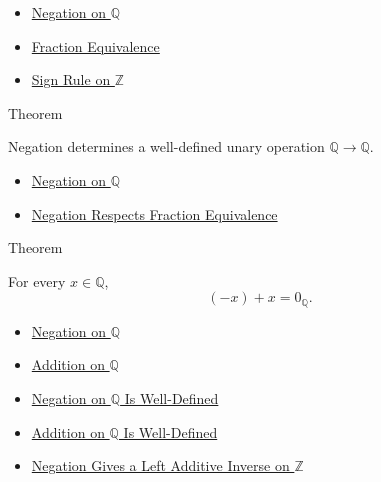 \begin{dependencies}
\begin{itemize}
  \item \hyperref[def:negation-on-q-classes]{Negation on $\mathbb{Q}$}
  \item \hyperref[def:fraction-equivalence]{Fraction Equivalence}
  \item \hyperref[cor:sign-rule-on-z]{Sign Rule on $\mathbb{Z}$}
\end{itemize}
\end{dependencies}

\begin{theorembox}{Theorem}
\begin{theorem}
\label{thm:negation-on-q-well-defined}
Negation determines a well-defined unary operation $\mathbb{Q}\to\mathbb{Q}$.
\end{theorem}
\end{theorembox}

\begin{dependencies}
\begin{itemize}
  \item \hyperref[def:negation-on-q-classes]{Negation on $\mathbb{Q}$}
  \item \hyperref[lem:negation-on-q-respects-equivalence]{Negation Respects Fraction Equivalence}
\end{itemize}
\end{dependencies}

\begin{theorembox}{Theorem}
\begin{theorem}
\label{thm:negation-left-additive-inverse-on-q}
For every $x\in\mathbb{Q}$,
\[
(-x)+x=0_{\mathbb{Q}}.
\]
\end{theorem}
\end{theorembox}

\begin{dependencies}
\begin{itemize}
  \item \hyperref[def:negation-on-q-classes]{Negation on $\mathbb{Q}$}
  \item \hyperref[def:addition-on-q-classes]{Addition on $\mathbb{Q}$}
  \item \hyperref[thm:negation-on-q-well-defined]{Negation on $\mathbb{Q}$ Is Well-Defined}
  \item \hyperref[thm:addition-on-q-well-defined]{Addition on $\mathbb{Q}$ Is Well-Defined}
  \item \hyperref[thm:negation-left-additive-inverse-on-z]{Negation Gives a Left Additive Inverse on $\mathbb{Z}$}
\end{itemize}
\end{dependencies}

